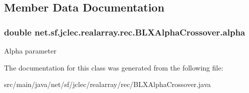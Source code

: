 \subsection{Member Data Documentation}
\hypertarget{classnet_1_1sf_1_1jclec_1_1realarray_1_1rec_1_1_b_l_x_alpha_crossover_a2eae05311a51136efa625d718bcb33b4}{
\subsubsection[{alpha}]{\setlength{\rightskip}{0pt plus 5cm}double net.\-sf.\-jclec.\-realarray.\-rec.\-B\-L\-X\-Alpha\-Crossover.\-alpha\hspace{0.3cm}{\ttfamily [protected]}}}\label{classnet_1_1sf_1_1jclec_1_1realarray_1_1rec_1_1_b_l_x_alpha_crossover_a2eae05311a51136efa625d718bcb33b4}
Alpha parameter 

The documentation for this class was generated from the following file\-:\begin{DoxyCompactItemize}
\item 
src/main/java/net/sf/jclec/realarray/rec/B\-L\-X\-Alpha\-Crossover.\-java\end{DoxyCompactItemize}
